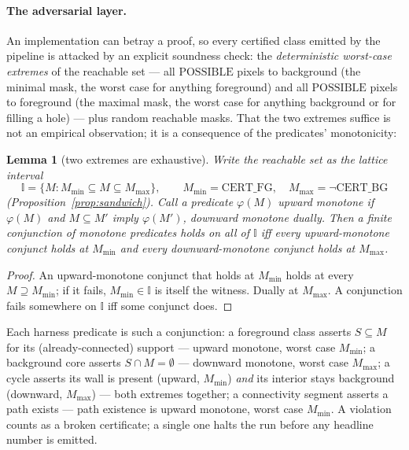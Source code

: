 \documentclass[10pt]{article}
\newcommand{\CFG}{\mathrm{CERT\_FG}}
\newcommand{\CBG}{\mathrm{CERT\_BG}}
\newcommand{\POSS}{\mathrm{POSSIBLE}}
\newtheorem{lemma}{Lemma}
\begin{document}
\paragraph{The adversarial layer.} An implementation can betray a proof,
so every certified class emitted by the pipeline is attacked by an
explicit soundness check: the \emph{deterministic worst-case extremes} of
the reachable set --- all $\POSS$ pixels to background (the minimal mask,
the worst case for anything foreground) and all $\POSS$ pixels to
foreground (the maximal mask, the worst case for anything background or
for filling a hole) --- plus random reachable masks. That the two
extremes suffice is not an empirical observation; it is a consequence of
the predicates' monotonicity:

\begin{lemma}[two extremes are exhaustive]\label{lem:extremes}
Write the reachable set as the lattice interval
\[
  \mathbb{I} = \{M : M_{\min} \subseteq M \subseteq M_{\max}\},
  \qquad M_{\min}=\CFG,\quad M_{\max}=\lnot\CBG
\]
(Proposition~\ref{prop:sandwich}). Call a predicate $\varphi(M)$
\emph{upward monotone} if $\varphi(M)$ and $M \subseteq M'$ imply
$\varphi(M')$, \emph{downward monotone} dually. Then a finite conjunction
of monotone predicates holds on all of $\mathbb{I}$ iff every
upward-monotone conjunct holds at $M_{\min}$ and every downward-monotone
conjunct holds at $M_{\max}$.
\end{lemma}
\begin{proof}
An upward-monotone conjunct that holds at $M_{\min}$ holds at every
$M \supseteq M_{\min}$; if it fails, $M_{\min} \in \mathbb{I}$ is itself
the witness. Dually at $M_{\max}$. A conjunction fails somewhere on
$\mathbb{I}$ iff some conjunct does.
\end{proof}

Each harness predicate is such a conjunction: a foreground class asserts
$S \subseteq M$ for its (already-connected) support --- upward monotone,
worst case $M_{\min}$; a background core asserts $S \cap M = \emptyset$
--- downward monotone, worst case $M_{\max}$; a cycle asserts its wall is
present (upward, $M_{\min}$) \emph{and} its interior stays background
(downward, $M_{\max}$) --- both extremes together; a connectivity segment
asserts a path exists --- path existence is upward monotone, worst case
$M_{\min}$. A violation counts as a broken certificate; a single one halts
the run before any headline number is emitted.
\end{document}
